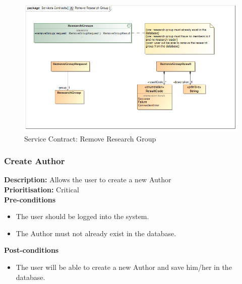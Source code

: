 \documentclass[a4paper]{article}
\begin{document}
    	    	\begin{figure}[H]
    	    		\centering
    	    		\includegraphics[width=\textwidth]{../Assignment1/5.1.14.Remove.Research.Group.Services.Contract.png}
    	    		\caption{Service Contract: Remove Research Group}
    	    	\end{figure}
    	
    	\pagebreak
    \subsubsection{Create Author}
    	\textbf{Description:} Allows the user to create a new Author\\
    	\textbf{Prioritisation:} Critical\\
    	
    	\textbf{Pre-conditions}
    	 \begin{itemize}
    		\item The user should be logged into the system.
    		\item The Author must not already exist in the database.
    	\end{itemize}
    	
    	\textbf{Post-conditions}
    	 \begin{itemize}
    		\item The user will be able to create a new Author and save him/her in the database.
    	\end{itemize}
    	
\end{document}
